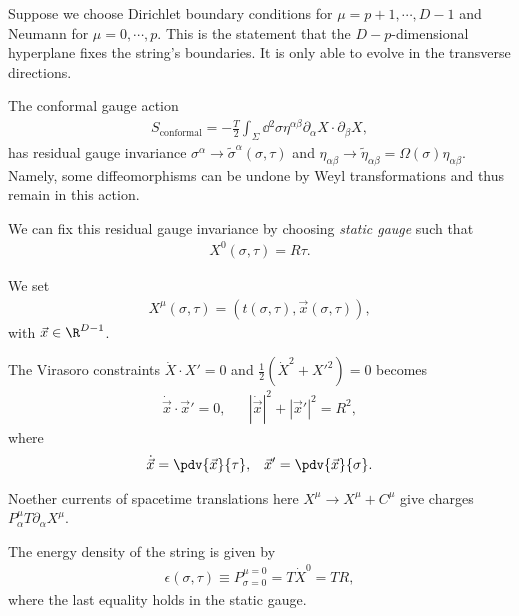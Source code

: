 Suppose we choose Dirichlet boundary conditions for $\mu = p+1, \cdots, D-1$ and Neumann for $\mu = 0, \cdots, p$. This is the statement that the $D-p$-dimensional hyperplane fixes the string's boundaries. It is only able to evolve in the transverse directions.


The conformal gauge action
\begin{align}
    S_\text{conformal} = -\frac{T}{2} \int_\Sigma \dd{^2 \sigma} \eta^{\alpha \beta} \partial_\alpha X \cdot \partial_\beta X
,\end{align}
has residual gauge invariance $\sigma^{\alpha} \to \widetilde{\sigma}^{\alpha}\left( \sigma, \tau \right) $ and $\eta_{\alpha \beta} \to \widetilde{\eta}_{\alpha \beta} = \Omega \left( \sigma \right) \eta_{\alpha \beta}$. Namely, some diffeomorphisms can be undone by Weyl transformations and thus remain in this action. 

We can fix this residual gauge invariance by choosing \emph{static gauge} such that
\begin{align}
    X^{0}\left( \sigma,\tau \right) = R \tau
.\end{align}


We set
\begin{align}
    X^{\mu}\left( \sigma, \tau \right) = \left( t \left( \sigma, \tau \right) , \vec{x}\left( \sigma, \tau \right)  \right) 
,\end{align}
with $\vec{x} \in \R^{D-1}$.

The Virasoro constraints $\dot{X} \cdot X' = 0$ and $\frac{1}{2} \left( \dot{X}^2 + X'^2 \right) = 0$ becomes
\begin{align}
    \dot{\vec{x}} \cdot \vec{x}' = 0, && \left| \dot{\vec{x}} \right|^2 + \left| \vec{x}' \right|^2 = R^2
,\end{align}
where
\begin{align}
    \dot{\vec{x}} = \pdv{\vec{x}}{\tau}, && \vec{x}' = \pdv{\vec{x}}{\sigma}
.\end{align}

Noether currents of spacetime translations here $X^{\mu} \to X^{\mu} + C^{\mu}$ give charges $P^{\mu}_\alpha T \partial_\alpha X^{\mu}$.


The energy density of the string is given by
\begin{align}
    \epsilon \left( \sigma, \tau \right) \equiv P^{\mu = 0}_{\sigma = 0} = T \dot{X}^{0} = TR
,\end{align}
where the last equality holds in the static gauge.

